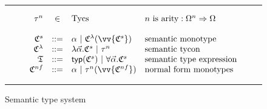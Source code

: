 \begin{figure}
\centering
\small
\hrule
\[
\begin{array}{rcll}
    \tau^n & \in & \mathrm{Tycs} & n\textrm{ is arity}: \Omega^n\Rightarrow \Omega\\
\\
    \mathfrak{C}^s & ::= & \alpha~|~\mathfrak{C}^\lambda(\vv{\mathfrak{C}^s}) & \textrm{semantic monotype}\\
    \mathfrak{C}^\lambda & ::= &
    \lambda\vec{\alpha}.\mathfrak{C}^s~|~\tau^n & \textrm{semantic tycon}\\
    \mathfrak{T} & ::= &
    \mathsf{typ}(\mathfrak{C}^s)~|~\forall\vec{\alpha}.\mathfrak{C}^s
    & \textrm{semantic type expression}\\
    \mathfrak{C}^{nf} & ::= &
    \alpha~|~\tau^n(\vv{\mathfrak{C}^{nf}}) & \textrm{normal form monotypes}\\
\end{array}
\]
\hrule
\caption{Semantic type system}
\label{fig:semtypesystem}
\end{figure}